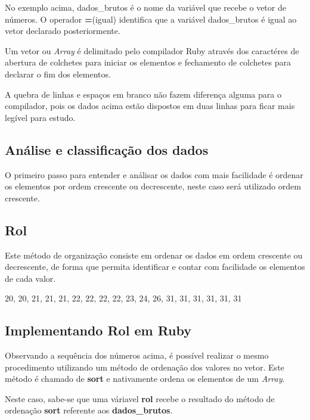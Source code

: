 \documentclass[12pt]{article}
\newcommand{\code}[1] {\textbf{#1}}
\begin{document}
 

No exemplo acima, dados\_brutos é o nome da variável que recebe o vetor de números. O operador \code{=}(igual) identifica que a variável dados\_brutos é igual ao vetor declarado posteriormente.

Um vetor ou \textit{Array} é delimitado pelo compilador Ruby através dos caractéres de abertura de colchetes para iniciar os elementos e fechamento de colchetes para declarar o fim dos elementos.

A quebra de linhas e espaços em branco não fazem diferença alguma para o compilador, pois os dados acima estão dispostos em duas linhas para ficar mais legível para estudo.


\subsection { Análise e classificação dos dados }

O primeiro passo para entender e análisar os dados com mais facilidade é ordenar os elementos por ordem crescente ou decrescente, neste caso será utilizado ordem crescente. 

\subsection { Rol }

Este método de organização consiste em ordenar os dados em ordem crescente ou decrescente, de forma que permita identificar e contar com facilidade os elementos de cada valor.

20, 20, 21, 21, 21, 22, 22, 22, 22, 23, 24, 26, 31, 31, 31, 31, 31, 31

\subsection { Implementando Rol em Ruby }

Observando a sequência dos números acima, é possível realizar o mesmo procedimento utilizando um método de ordenação dos valores no vetor. Este método é chamado de \code{sort} e nativamente ordena os elementos de um \textit{Array}.

 

Neste caso, sabe-se que uma váriavel \code{rol} recebe o resultado do método de ordenação \code{sort} referente aos \code{dados\_brutos}.
\end{document}
